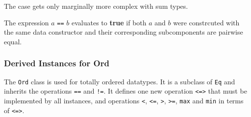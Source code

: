 The case gets only marginally more complex with sum types.

The expression $a$ \texttt{==} $b$ evaluates to \textbf{true} if both $a$ and $b$ were constrcuted with the same data constructor and their corresponding subcomponents are pairwise equal.

\subsubsection{Derived Instances for Ord}
The \texttt{Ord} class is used for totally ordered datatypes. It is a subclass of \texttt{Eq} and inherits the operations \texttt{==} and \texttt{!=}. It defines one new operation \texttt{<=>} that must be implemented by all instances, and operations \texttt{<}, \texttt{<=}, \texttt{>}, \texttt{>=}, \texttt{max} and \texttt{min} in terms of \texttt{<=>}.

